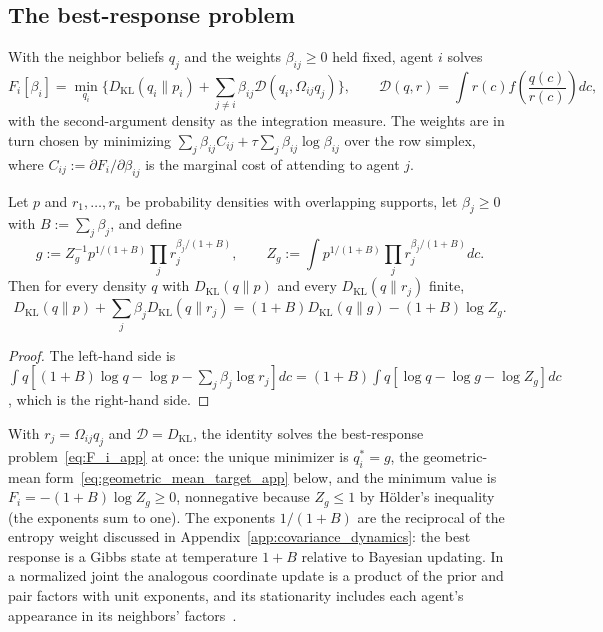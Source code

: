 \subsection*{The best-response problem}

With the neighbor beliefs $q_j$ and the weights $\beta_{ij} \geq 0$ held fixed, agent $i$ solves
\begin{equation}
F_i[\beta_i]
=\min_{q_i}
\Big\{
D_{\mathrm{KL}}(q_i \| p_i)
+ \sum_{j\neq i} \beta_{ij}\mathcal{D}(q_i,\Omega_{ij}q_j)
\Big\},
\qquad
\mathcal{D}(q, r) = \int r(c) f\left(\frac{q(c)}{r(c)}\right)dc,
\label{eq:F_i_app}
\end{equation}
with the second-argument density as the integration measure. The weights are in turn chosen by minimizing $\sum_{j}\beta_{ij}C_{ij} + \tau\sum_{j}\beta_{ij}\log\beta_{ij}$ over the row simplex, where $C_{ij} := \partial F_i/\partial\beta_{ij}$ is the marginal cost of attending to agent $j$.

\begin{lemma}
\label{lem:kl_sum_identity}
Let $p$ and $r_1, \dots, r_n$ be probability densities with overlapping supports, let $\beta_j \geq 0$ with $B := \sum_j\beta_j$, and define
\begin{equation}
g := Z_g^{-1}p^{1/(1+B)}\prod_j r_j^{\beta_j/(1+B)},
\qquad
Z_g := \int p^{1/(1+B)}\prod_j r_j^{\beta_j/(1+B)}dc.
\end{equation}
Then for every density $q$ with $D_{\mathrm{KL}}(q\|p)$ and every $D_{\mathrm{KL}}(q\|r_j)$ finite,
\begin{equation}
D_{\mathrm{KL}}(q\|p) + \sum_j\beta_jD_{\mathrm{KL}}(q\|r_j) = (1+B)D_{\mathrm{KL}}(q\|g) - (1+B)\log Z_g.
\label{eq:kl_sum_identity}
\end{equation}
\end{lemma}

\begin{proof}
The left-hand side is $\int q[(1+B)\log q - \log p - \sum_j\beta_j\log r_j]dc = (1+B)\int q[\log q - \log g - \log Z_g]dc$, which is the right-hand side.
\end{proof}

With $r_j = \Omega_{ij}q_j$ and $\mathcal{D} = D_{\mathrm{KL}}$, the identity solves the best-response problem~\eqref{eq:F_i_app} at once: the unique minimizer is $q_i^* = g$, the geometric-mean form~\eqref{eq:geometric_mean_target_app} below, and the minimum value is $F_i = -(1+B)\log Z_g \geq 0$, nonnegative because $Z_g \leq 1$ by H\"older's inequality (the exponents sum to one). The exponents $1/(1+B)$ are the reciprocal of the entropy weight discussed in Appendix~\ref{app:covariance_dynamics}: the best response is a Gibbs state at temperature $1+B$ relative to Bayesian updating. In a normalized joint the analogous coordinate update is a product of the prior and pair factors with unit exponents, and its stationarity includes each agent's appearance in its neighbors' factors~\cite[Ch.~5, local Gibbs bound and exact block E-coordinate]{DennisGaugeVFE2026}.

